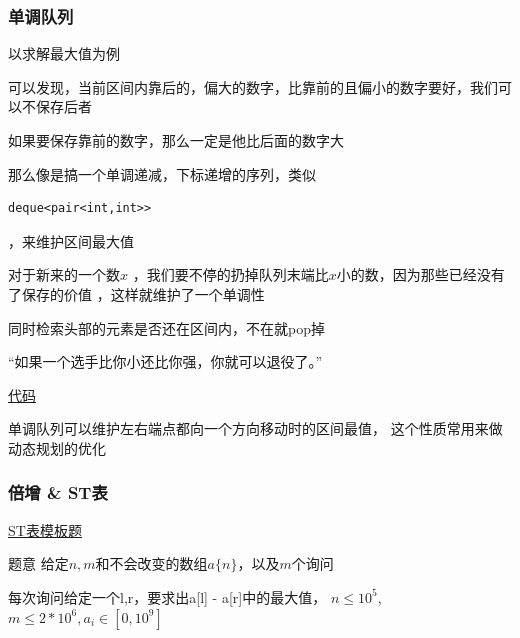 \documentclass{beamer}
\begin{document}
  \begin{frame}[fragile]
    \frametitle{单调队列}
    以求解最大值为例

    可以发现，当前区间内靠后的，偏大的数字，比靠前的且偏小的数字要好，我们可以不保存后者

    \pause

    \vspace*{1\baselineskip}

    如果要保存靠前的数字，那么一定是他比后面的数字大

    \pause

    那么像是搞一个单调递减，下标递增的序列，类似
    \begin{lstlisting}
deque<pair<int,int>>
    \end{lstlisting}
    ，来维护区间最大值

    \pause

    对于新来的一个数$x$
    ，我们要不停的扔掉队列末端比$x$小的数，因为那些已经没有了保存的价值
    ，这样就维护了一个单调性

    \vspace*{1\baselineskip}

    同时检索头部的元素是否还在区间内，不在就pop掉
  \end{frame}

  \begin{frame}
    “如果一个选手比你小还比你强，你就可以退役了。”
    
    \vspace*{1\baselineskip}
    
    \href{http://syh521.cn/file/monotone-queue.cpp}{代码}
    
    \vspace*{1\baselineskip}

    单调队列可以维护左右端点都向一个方向移动时的区间最值，
    这个性质常用来做动态规划的优化
  \end{frame}

  \begin{frame}
    \frametitle{倍增 \& ST表}
    \href{https://www.luogu.com.cn/problem/P3865}{ST表模板题}

    \vspace*{1\baselineskip}

    \begin{block}{题意}
      给定$n,m$和不会改变的数组$a\{n\}$，以及$m$个询问

      每次询问给定一个l,r，要求出a[l] - a[r]中的最大值，
      $n\leq 10^5$,$m\leq 2*10^6,a_i\in[0,10^9]$
    \end{block}
  \end{frame}
\end{document}
